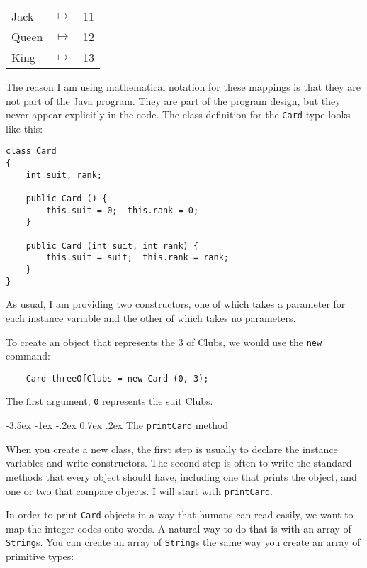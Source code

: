 \documentclass{book}
\makeatletter
\renewcommand{\section}{\@startsection 
    {section} {1} {0mm}%
    {-3.5ex \@plus -1ex \@minus -.2ex}%
    {0.7ex \@plus.2ex}%
    {\normalfont\Large\bfseries}}
\makeatother
\begin{document}
\begin{tabular}{l c l}
Jack & $\mapsto$ & 11 \\
Queen & $\mapsto$ & 12 \\
King & $\mapsto$ & 13 \\
\end{tabular}

The reason I am using mathematical notation for these mappings is
that they are not part of the Java program.  They are part of the
program design, but they never appear explicitly in the code.
The class definition for the {\tt Card} type looks like this:

\begin{verbatim}
class Card
{
    int suit, rank;

    public Card () { 
        this.suit = 0;  this.rank = 0;
    }

    public Card (int suit, int rank) { 
        this.suit = suit;  this.rank = rank;
    }
}
\end{verbatim}

As usual, I am providing two constructors, one of which takes
a parameter for each instance variable and the other of which
takes no parameters.


To create an object that represents the 3 of Clubs, we would
use the {\tt new} command:

\begin{verbatim}
    Card threeOfClubs = new Card (0, 3);
\end{verbatim}
%
The first argument, {\tt 0} represents the suit Clubs.

\section{The {\tt printCard} method}
\label{printcard}

When you create a new class, the first step is usually to declare the
instance variables and write constructors.  The second step is often
to write the standard methods that every object should have, including
one that prints the object, and one or two that compare objects.  I
will start with {\tt printCard}.


In order to print {\tt Card} objects in a way that humans
can read easily, we want to map the integer codes onto words.
A natural way to do that is with an array of {\tt String}s.  You
can create an array of {\tt String}s the same way you create an
array of primitive types:
\end{document}
